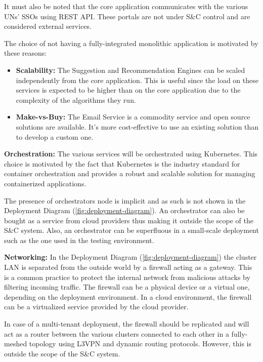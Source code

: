 It must also be noted that the core application communicates with the various UNs' SSOs using REST API. These portals
are not under S\&C control and are considered external services.

The choice of not having a fully-integrated monolithic application is motivated by these reasons:

\begin{itemize}
      \item \textbf{Scalability:} The Suggestion and Recommendation Engines can be scaled independently from the core
            application. This is useful since the load on these services is expected to be higher than on the core
            application due to the complexity of the algorithms they run.
      \item \textbf{Make-vs-Buy:} The Email Service is a commodity service and open source solutions are available.
            It's more cost-effective to use an existing solution than to develop a custom one.
\end{itemize}

\par{\textbf{Orchestration:}} The various services will be orchestrated using Kubernetes. This choice is motivated by
the fact that Kubernetes is the industry standard for container orchestration and provides a robust and scalable
solution for managing containerized applications.

The presence of orchestrators node is implicit and as such is not shown in the Deployment Diagram
(\ref{fig:deployment-diagram}). An orchestrator can also be bought as a service from cloud providers thus making it
outside the scope of the S\&C system.  Also, an orchestrator can be superfluous in a small-scale deployment
such as the one used in the testing environment.

\par{\textbf{Networking:}} In the Deployment Diagram (\ref{fig:deployment-diagram}) the cluster LAN is separated from
the outside world by a firewall acting as a gateway. This is a common practice to protect the internal network from
malicious attacks by filtering incoming traffic. The firewall can be a physical device or a virtual one, depending on
the deployment environment. In a cloud environment, the firewall can be a virtualized service provided by the cloud
provider.

In case of a multi-tenant deployment, the firewall should be replicated and will act as a router between the various
clusters connected to each other in a fully-meshed topology using L3VPN and dynamic routing protocols. However, this
is outside the scope of the S\&C system.
